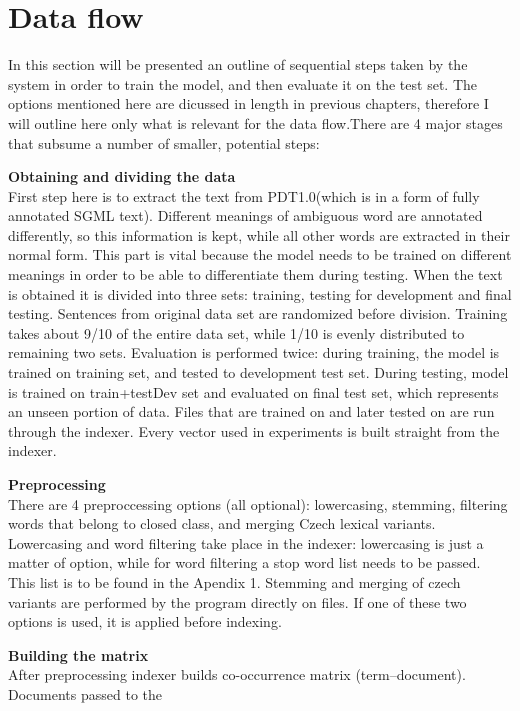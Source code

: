 \section{Data flow}
In this section will be presented an outline of sequential steps taken by the system in order to train the
model, and then evaluate it on the test set. The options  mentioned here are dicussed in length in previous chapters,  therefore I will 
outline here only what is relevant for the data flow.There are 4 major stages that subsume a number of 
smaller, potential steps:
\begin{description}
\item \textbf{Obtaining and dividing the data} \hfill \\
	First step here is to extract the text from PDT1.0(which is in a form of fully annotated SGML text). 
Different meanings of ambiguous word are annotated differently, so this information is kept, while all
other words are extracted in their normal form. This part is vital because the model needs to be trained
on different meanings in order to be able to differentiate them during testing. 
	When the text is obtained it is divided into three sets: training, testing for development and final testing. Sentences from 
original data set are randomized before division. Training takes about 9/10 of the entire data set, while 1/10 is evenly 
distributed to remaining two sets. Evaluation is performed twice: during training, the model is trained 
on training set, and tested to development test set.  During testing, model is trained on train+testDev 
set and evaluated on final test set, which represents an unseen portion of data. Files that are trained on
and later tested on are run through the indexer. Every vector used in experiments is built straight from 
the indexer. 
\item \textbf{Preprocessing} \hfill \\
There are 4 preproccessing options (all optional): lowercasing, stemming, filtering words that belong to closed class,
and merging Czech lexical variants.  Lowercasing and word filtering take place in the indexer: lowercasing is just a matter of option, while for word filtering a stop word list needs to be passed. This list is to be found in the Apendix 1. Stemming and merging of czech variants are performed by the program directly on files. If one of these two options is used, it is applied before indexing.  
\item \textbf{Building the matrix}\hfill \\
After preprocessing indexer builds co-occurrence matrix (term--document). Documents passed to the 

\end{description}

